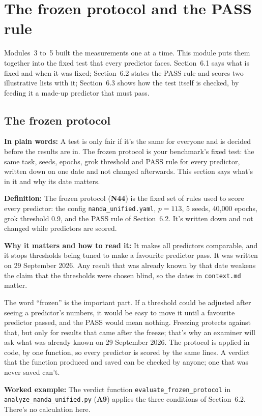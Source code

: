 \documentclass[11pt,a4paper,oneside,openany]{report}
\newcommand{\code}[1]{\texttt{#1}}
\newcommand{\gl}[1]{\textbf{#1}}   %
\newcommand{\fplain}{\textbf{In plain words:} }
\newcommand{\fdef}{\textbf{Definition:} }
\newcommand{\fread}{\par\textbf{Why it matters and how to read it:} }
\newcommand{\fex}{\par\textbf{Worked example:} }
\begin{document}
\chapter{The frozen protocol and the PASS rule}

Modules~3 to~5 built the measurements one at a time. This module puts them together into the fixed test that every predictor faces. Section~6.1 says what is fixed and when it was fixed; Section~6.2 states the PASS rule and scores two illustrative lists with it; Section~6.3 shows how the test itself is checked, by feeding it a made-up predictor that must pass.

\section{The frozen protocol}
\fplain A test is only fair if it's the same for everyone and is decided before the results are in. The frozen protocol is your benchmark's fixed test: the same task, seeds, epochs, grok threshold and PASS rule for every predictor, written down on one date and not changed afterwards. This section says what's in it and why its date matters.

\fdef The frozen protocol (\gl{N44}) is the fixed set of rules used to score every predictor: the config \code{nanda\_\allowbreak{}unified.yaml}, $p = 113$, 5 seeds, 40{,}000 epochs, grok threshold 0.9, and the PASS rule of Section~6.2. It's written down and not changed while predictors are scored.
\fread It makes all predictors comparable, and it stops thresholds being tuned to make a favourite predictor pass. It was written on 29 September 2026. Any result that was already known by that date weakens the claim that the thresholds were chosen blind, so the dates in \code{context.md} matter.

The word ``frozen'' is the important part. If a threshold could be adjusted after seeing a predictor's numbers, it would be easy to move it until a favourite predictor passed, and the PASS would mean nothing. Freezing protects against that, but only for results that came after the freeze; that's why an examiner will ask what was already known on 29 September 2026. The protocol is applied in code, by one function, so every predictor is scored by the same lines. A verdict that the function produced and saved can be checked by anyone; one that was never saved can't.

\fex The verdict function \code{evaluate\_\allowbreak{}frozen\_\allowbreak{}protocol} in \code{analyze\_\allowbreak{}nanda\_\allowbreak{}unified.py} (\gl{A9}) applies the three conditions of Section~6.2. There's no calculation here.
\end{document}
